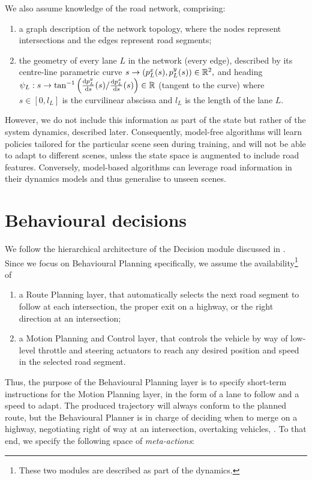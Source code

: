 We also assume knowledge of the road network, comprising:
\begin{enumerate}[label=(\roman*)]
	\item a graph description of the network topology, where the nodes represent intersections and the edges represent road segments;
	\item the geometry of every lane $L$ in the network (every edge), described by its centre-line parametric curve
	$
	s \rightarrow (p^x_{L}(s), p^y_{L}(s))\in \mathbb{R}^2,
	$
	\noindent and heading $\psi_L:s \rightarrow \tan^{-1}\left({\odv{p^y_{L}}{s}(s)}/{\odv{p^x_{L}}{s}(s)}\right) \in \Real$
	(tangent to the curve) where $s\in[0, l_L]$ is the curvilinear abscissa and $l_L$ is the length of the lane $L$.
\end{enumerate}

However, we do not include this information as part of the state but rather of the system dynamics, described later. Consequently, model-free algorithms will learn policies tailored for the particular scene seen during training, and will not be able to adapt to different scenes, unless the state space is augmented to include road features. Conversely, model-based algorithms can leverage road information in their dynamics models and thus generalise to unseen scenes.

\section{Behavioural decisions}

We follow the hierarchical architecture of the Decision module discussed in . Since we focus on Behavioural Planning specifically, we assume the availability\footnote{These two modules are described as part of the dynamics.} of
\begin{enumerate}[label=(\roman*)]
	\item a Route Planning layer, that automatically selects the next road segment to follow at each intersection, \eg the proper exit on a highway, or the right direction at an intersection;
	\item a Motion Planning and Control layer, that controls the vehicle by way of low-level throttle and steering actuators to reach any desired position and speed in the selected road segment. 
\end{enumerate}

Thus, the purpose of the Behavioural Planning layer is to specify short-term instructions for the Motion Planning layer, in the form of a lane to follow and a speed to adapt. The produced trajectory will always conform to the planned route, but the Behavioural Planner is in charge of \eg deciding when to merge on a highway, negotiating right of way at an intersection, overtaking vehicles, \etc. To that end, we specify the following space of \emph{meta-actions}:

